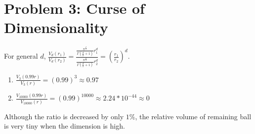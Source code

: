 \documentclass[11pt]{article}
\begin{document}
\section*{Problem 3: Curse of Dimensionality}
	For general $d$, $\frac{V_d(r_1)}{V_d(r_2)} = \frac{\frac{\pi^{\frac{d}{2}}}{\Gamma(\frac{d}{2} + 1)}r_1^d} {\frac{\pi^{\frac{d}{2}}}{\Gamma(\frac{d}{2} + 1)}r_2^d} = \left(\frac{r_1}{r_2}\right)^{d}$.
	\begin{enumerate}
		\item $\frac{V_3(0.99r)}{V_3(r)} = \left(0.99\right)^3 \approx 0.97$
		\item $\frac{V_{10000}(0.99r)}{V_{10000}(r)} = \left(0.99\right)^{10000} \approx 2.24*10^{-44} \approx 0$
	\end{enumerate}
	Although the ratio is decreased by only $1\%$, the relative volume of remaining ball is very tiny when the dimension is high.
\end{document}
